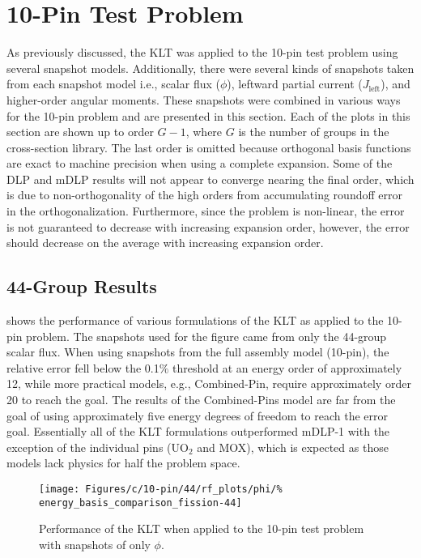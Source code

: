 \section{10-Pin Test Problem}

As previously discussed, the KLT was applied to the 10-pin test problem using 
several snapshot models.  Additionally, there were several kinds of snapshots 
taken 
from each snapshot model i.e., scalar flux ($\phi$), leftward partial current 
($J_{\text{left}}$), and higher-order angular 
moments.  These snapshots were combined in various ways for the 10-pin problem 
and are presented in this section.  Each of the plots in this section are shown 
up to order $G-1$, where $G$ is the number of groups in the cross-section 
library.  The last order is omitted because orthogonal basis functions are 
exact to machine precision when using a complete expansion.  Some of the DLP and 
mDLP results will not appear to converge nearing the final order, which is due 
to non-orthogonality of the high orders from accumulating roundoff error in the 
orthogonalization.  Furthermore, since the problem is non-linear, the error is 
not guaranteed to decrease with increasing expansion order, however, the error 
should decrease on the average with increasing expansion order.

\subsection{44-Group Results}

 shows the performance of various formulations 
of the KLT as applied to the 10-pin problem.  The snapshots used for the figure 
came from only the 44-group scalar flux.  When using snapshots from the full 
assembly model (10-pin), 
    the relative error fell below the 0.1$\%$ threshold at an energy order of 
    approximately 12, while more practical models, e.g., 
Combined-Pin, require approximately order 20 to reach the goal.  The results of 
the 
Combined-Pins model are far from 
the goal of using approximately five energy degrees of freedom to reach the 
error goal.  
Essentially all of the KLT formulations outperformed mDLP-1 with the 
exception of the 
individual pins (UO$_2$ and MOX), which is expected as those models lack 
physics 
for half the problem space.

\begin{figure*}[tb]
    \centering
    \texttt{[image: Figures/c/10-pin/44/rf\_plots/phi/\%
        energy\_basis\_comparison\_fission-44]}
    \caption{Performance of the KLT when applied to the 10-pin test problem 
        with snapshots of only $\phi$.}
    \label{fig:10-pin-flux-only}
\end{figure*}

